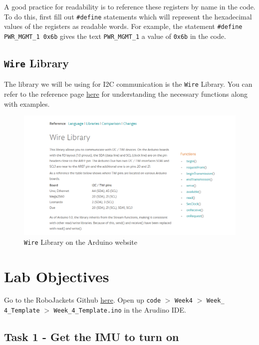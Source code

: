 \documentclass{article}
\begin{document}
        A good practice for readability is to reference these registers by name in the code. To do this, first fill out \texttt{\#define} statements which will represent the hexadecimal values of the registers as readable words. For example, the statement \texttt{\#define PWR\_MGMT\_1 0x6b} gives the text \texttt{PWR\_MGMT\_1} a value of \texttt{0x6b} in the code.  
        
    \subsection{\texttt{Wire} Library}
        The library we will be using for I2C communication is the \texttt{Wire} Library. You can refer to the reference page \href{https://www.arduino.cc/en/reference/wire}{here} for understanding the necessary functions along with examples.
        
        \begin{figure}[ht]
            \centering
            \includegraphics[width = 1.0\textwidth]{img/WireLibrary.PNG}
            \caption{\texttt{Wire} Library on the Arduino website}
        \end{figure}
        
\section{Lab Objectives}

    Go to the RoboJackets Github
    \href{https://github.com/RoboJackets/firmware-training}{here}. Open up \texttt{code} $>$ \texttt{Week4} $>$ \texttt{Week\_ 4\_Template} $>$ \texttt{Week\_4\_Template.ino} in the Arudino IDE. 

    \subsection{Task 1 - Get the IMU to turn on}
    
\end{document}
